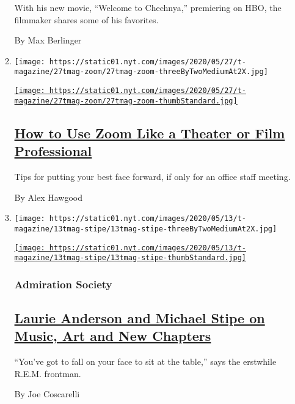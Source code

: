 \begin{enumerate}
\begin{enumerate}
    With his new movie, ``Welcome to Chechnya,'' premiering on HBO, the
    filmmaker shares some of his favorites.

    By Max Berlinger
  \item
    \texttt{[image: https://static01.nyt.com/images/2020/05/27/t-magazine/27tmag-zoom/27tmag-zoom-threeByTwoMediumAt2X.jpg]}

    \href{/2020/05/27/t-magazine/zoom-tips-coronavirus.html}{\texttt{[image: https://static01.nyt.com/images/2020/05/27/t-magazine/27tmag-zoom/27tmag-zoom-thumbStandard.jpg]}}

    \hypertarget{how-to-use-zoom-like-a-theater-or-film-professional}{%
    \subsection{\texorpdfstring{\href{/2020/05/27/t-magazine/zoom-tips-coronavirus.html}{How
    to Use Zoom Like a Theater or Film
    Professional}}{How to Use Zoom Like a Theater or Film Professional}}\label{how-to-use-zoom-like-a-theater-or-film-professional}}

    Tips for putting your best face forward, if only for an office staff
    meeting.

    By Alex Hawgood
  \item
    \texttt{[image: https://static01.nyt.com/images/2020/05/13/t-magazine/13tmag-stipe/13tmag-stipe-threeByTwoMediumAt2X.jpg]}

    \href{/2020/05/14/t-magazine/michael-stipe-laurie-anderson.html}{\texttt{[image: https://static01.nyt.com/images/2020/05/13/t-magazine/13tmag-stipe/13tmag-stipe-thumbStandard.jpg]}}

    \hypertarget{admiration-society}{%
    \subsubsection{Admiration Society}\label{admiration-society}}

    \hypertarget{laurie-anderson-and-michael-stipe-on-music-art-and-new-chapters}{%
    \subsection{\texorpdfstring{\href{/2020/05/14/t-magazine/michael-stipe-laurie-anderson.html}{Laurie
    Anderson and Michael Stipe on Music, Art and New
    Chapters}}{Laurie Anderson and Michael Stipe on Music, Art and New Chapters}}\label{laurie-anderson-and-michael-stipe-on-music-art-and-new-chapters}}

    ``You've got to fall on your face to sit at the table,'' says the
    erstwhile R.E.M. frontman.

    By Joe Coscarelli
  \end{enumerate}
\end{enumerate}

